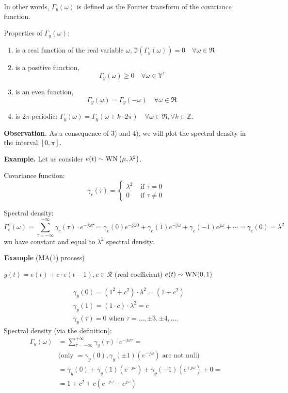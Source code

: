 In other words, $\Gamma_y(\omega)$ is defined as the Fourier transform of the covariance function.

Properties of $\Gamma_{y}(\omega)$:
\begin{enumerate}
	\item is a real function of the real variable $\omega$, $\Im\left(\Gamma_{y}(\omega)\right)=0 \quad \forall \omega \in \Re$
	\item is a positive function,
	$$
		\Gamma_{y}(\omega) \geq 0 \quad \forall \omega \in \mathbb{Y}^{\mathrm{r}}
	$$
	\item is an even function,
	$$
		\Gamma_{y}(\omega)=\Gamma_{y}(-\omega) \quad \forall \omega \in \Re
	$$
	\item is $2\pi$-periodic: $\Gamma_{y}(\omega)=\Gamma_{y}(\omega+k \cdot 2 \pi) \quad \forall \omega \in \Re, \forall k \in \mathbb{Z}$.
\end{enumerate}

\textbf{Observation.}
As a consequence of 3) and 4), we will plot the spectral density in the interval $[0, \pi]$.

\textbf{Example.}
Let us consider $e(t) \sim \operatorname{WN}\left(\mu, \lambda^{2}\right)$. 

Covariance function:
\[
	\gamma_{e}(\tau)= \begin{cases}\lambda^{2} & \text { if } \tau=0 \\ 0 & \text { if } \tau \neq 0\end{cases}
\]


Spectral density:
\[
	\Gamma_{e}(\omega) =\sum_{\tau=-\infty}^{+\infty} \gamma_{e}(\tau) \cdot e^{-j \omega \tau}=\gamma_{e}(0) e^{-j \omega 0}+\gamma_{e}(1) e^{-j \omega}+\gamma_{e}(-1) e^{j \omega}+\cdots=\gamma_{e}(0)=\lambda^{2}
\]
\gls{wn} have constant and equal to $\lambda^{2}$ spectral density.

\textbf{Example} (MA(1) process)

$y(t)=e(t)+c \cdot e(t-1), c \in \mathcal{R}$ (real coefficient)
$e(t)\sim \operatorname{WN}(0,1 )$

\begin{align*}
	&\gamma_{y}(0)=\left(1^{2}+c^{2}\right)\cdot \lambda^{2}=(1+c^{2})\\
	&\gamma_{y}(1)=(1 \cdot c) \cdot \lambda^{2}=c \\
	&\gamma_{y}(\tau)=0 \text { when } \tau=\ldots, \pm 3, \pm 4, \ldots .
\end{align*}
Spectral density (via the definition):
\begin{align*}
	\Gamma_{y}(\omega)&=\sum_{\tau=-\infty}^{+\infty} \gamma_{y}(\tau) \cdot e^{-j \omega \tau}= \\
	&\text{(only $=\gamma_{y}(0), \gamma_{y}(\pm 1)\left(e^{-j \omega}\right)$ are not null)} \\
	&=\gamma_{y}(0)+\gamma_{y}(1)\left(e^{-j \omega}\right)+\gamma_{y}(-1)\left(e^{+j \omega}\right)+0= \\
	&=1+c^{2}+c\left(e^{-j \omega}+e^{j \omega}\right)
\end{align*}

